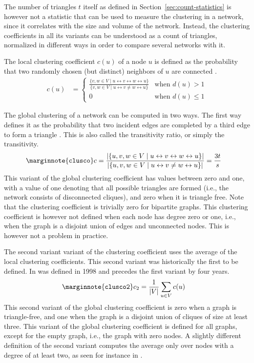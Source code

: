 \documentclass{article}
\begin{document}
The number of triangles $t$ itself as defined in
Section~\ref{sec:count-statistics} is however not a statistic that can
be used to measure the clustering in a network, since it correlates with
the size and volume of the network.  Instead, the clustering
coefficients in all its variants can be understood as a count of
triangles, normalized in different ways in order to compare several
networks with it.

The local clustering coefficient $c(u)$ of a node $u$ is defined as the
probability that two randomly chosen (but distinct) neighbors of $u$ are
connected \citep{b228}.
\begin{align}
  c(u) &= \left\{ \begin{array}{ll} \frac { \{ v, w \in V \mid u \leftrightarrow v
      \leftrightarrow w \leftrightarrow u \} } { \{ v, w \in V \mid u \leftrightarrow v \neq w \leftrightarrow u \}
    } & \text{when } d(u) > 1 \\ 0 & \text{when } d(u) \leq 1
          \end{array} \right. 
\end{align}

The global clustering of a network can be computed in two ways.  The
first way defines it as the probability that two incident edges are
completed by a third edge to form a triangle \citep{b736}. This is also
called the transitivity ratio, or simply the transitivity.
\begin{align}
  \marginnote{\texttt{clusco}} c &= 
  \frac {|\{ u, v, w \in V \mid u \leftrightarrow v \leftrightarrow w \leftrightarrow u \}|} 
        {|\{ u, v, w \in V \mid u \leftrightarrow v \neq w \leftrightarrow u \}|} 
        = \frac {3t} s
\end{align}
This variant of the global clustering coefficient has values between
zero and one, with a value of one denoting that all possible triangles
are formed (i.e., the network consists of disconnected cliques), and
zero when it is triangle free.  Note that the clustering coefficient is
trivially zero for bipartite graphs.  This clustering coefficient is
however not defined when each node has degree zero or one, i.e., when
the graph is a disjoint union of edges and unconnected nodes.  This is
however not a problem in practice.

The second variant variant of the clustering coefficient uses the
average of the local clustering coefficients. This second variant was
historically the first to be defined.  In was defined in
1998 \citep{b228} and precedes the first variant by four years.
\begin{align}
  \marginnote{\texttt{clusco2}} c_2 &= \frac 1 {|V|} \sum_{u \in V} c(u)
\end{align}
This second variant of the global clustering coefficient is zero when a
graph is triangle-free, and one when the graph is a disjoint union of
cliques of size at least three.  This variant of the global clustering
coefficient is defined for all graphs, except for the empty graph, i.e.,
the graph with zero nodes.  A slightly different definition of the
second variant computes the average only over nodes with a degree of at
least two, as seen for instance in \citep{b845}.
\end{document}
